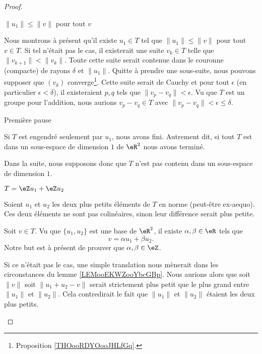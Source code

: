 \begin{proof}
\begin{subproof}
        \item[\( \| u_1 \|\leq \| v \|\) pour tout \( v\)]

            Nous montrons à présent qu'il existe \( u_1\in T\) tel que \( \| u_1 \|\leq \| v \|\) pour tout \( v\in T\). Si tel n'était pas le cas, il existerait une suite \( v_k\in T\) telle que \( \| v_{k+1} \|<\| v_k \|\). Toute cette suite serait contenue dans le couronne (compacte) de rayons \( \delta\) et \( \| u_1 \|\). Quitte à prendre une sous-suite, nous pouvons supposer que \( (v_k)\) converge\footnote{Proposition \ref{THOooRDYOooJHLfGq}.}. Cette suite serait de Cauchy et pour tout \( \epsilon\) (en particulier \( \epsilon<\delta\)), il existeraient \( p,q\) tels que \( \| v_p-v_q \|<\epsilon\). Vu que \( T\) est un groupe pour l'addition, nous aurions \( v_p-v_q\in T\) avec \( \| v_p-v_q \|<\epsilon\leq \delta\).

        \item[Première pause]

            Si \( T\) est engendré seulement par \( u_1\), nous avons fini. Autrement dit, si tout \( T\) est dans un sous-espace de dimension \( 1\) de \( \eR^2\) nous avons terminé.

            Dans la suite, nous supposons donc que \( T\) n'est pas contenu dans un sous-espace de dimension \( 1\).

        \item[\( T=\eZ u_1 + \eZ u_2\)]

            Soient \( u_1\) et \( u_2\) les deux plus petits éléments de \( T\) en norme (peut-être ex-aequo). Ces deux éléments ne sont pas colinéaires, sinon leur différence serait plus petite.

            Soit \( v\in T\). Vu que \( \{ u_1,u_2 \}\) est une base de \( \eR^2\), il existe \( \alpha,\beta\in \eR\) tels que
            \begin{equation}
                v=\alpha u_1+\beta u_2.
            \end{equation}
            Notre but est à présent de prouver que \( \alpha,\beta\in \eZ\).

            Si ce n'était pas le cas, une simple translation nous mènerait dans les circonstances du lemme \ref{LEMooEKWZooYbcGBp}. Nous aurions alors que soit \( \| v \|\) soit \(\| u_1+u_2-v \|\) serait strictement plus petit que le plus grand entre \( \| u_1 \|\) et \( \| u_2 \|\). Cela contredirait le fait que \( \| u_1 \|\) et \( \| u_2 \|\) étaient les deux plus petits.
    \end{subproof}
\end{proof}

